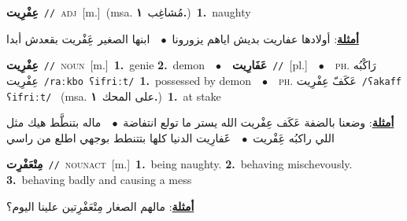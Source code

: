 \documentclass[10pt,a4paper,twoside]{article} %
\begin{document}
\begin{multicols}{2}
{\setlength\topsep{0pt}\textbf{\foreignlanguage{arabic}{عِفْرِيت}}\ {\color{gray}\texttt{//}\color{black}}\ \textsc{adj}\ [m.]\ \color{gray}(msa. \foreignlanguage{arabic}{مُشاغِب}~\foreignlanguage{arabic}{\textbf{١.}})\color{black}\ \textbf{1.}~naughty\  \begin{flushright}\color{gray}\foreignlanguage{arabic}{\textbf{\underline{\foreignlanguage{arabic}{أمثلة}}}: أولادها عفاريت بديش اياهم يزورونا\ $\bullet$\ \  ابنها الصغير عَِفْريت بقعدش أبدا}\end{flushright}\color{black}} \vspace{2mm}

{\setlength\topsep{0pt}\textbf{\foreignlanguage{arabic}{عِفْرِيت}}\ {\color{gray}\texttt{//}\color{black}}\ \textsc{noun}\ [m.]\ \textbf{1.}~genie  \textbf{2.}~demon\ \ $\bullet$\ \ \setlength\topsep{0pt}\textbf{\foreignlanguage{arabic}{عَفَارِيت}}\ {\color{gray}\texttt{//}\color{black}}\ [pl.]\ \ $\bullet$\ \ \textsc{ph.} \color{gray} \foreignlanguage{arabic}{رَاكْبُه عِفْرِيت}\color{black}\ {\color{gray}\texttt{/{\sffamily raːkbo ʕifriːt}/}\color{black}}\ \textbf{1.}~possessed by demon\ \ $\bullet$\ \ \textsc{ph.} \color{gray} \foreignlanguage{arabic}{عَكَفّ عِفْرِيت}\color{black}\ {\color{gray}\texttt{/{\sffamily ʕakaff ʕifriːt}/}\color{black}}\ \color{gray} (msa. \foreignlanguage{arabic}{على المحك}~\foreignlanguage{arabic}{\textbf{١.}})\color{black}\ \textbf{1.}~at stake\  \begin{flushright}\color{gray}\foreignlanguage{arabic}{\textbf{\underline{\foreignlanguage{arabic}{أمثلة}}}: وضعنا بالضفة عَكَف عِفْريت الله يستر ما تولع انتفاضة\ $\bullet$\ \  ماله بتنطَّط هيك مثل اللي راكبُه عَِفْريت\ $\bullet$\ \  عََفارِيت الدنيا كلها بتتنطط بوجهي اطلع من راسي}\end{flushright}\color{black}} \vspace{2mm}

{\setlength\topsep{0pt}\textbf{\foreignlanguage{arabic}{مِتْعَفْرِت}}\ {\color{gray}\texttt{//}\color{black}}\ \textsc{noun\textunderscore act}\ [m.]\ \textbf{1.}~being naughty.  \textbf{2.}~behaving mischevously.  \textbf{3.}~behaving badly and causing a mess\  \begin{flushright}\color{gray}\foreignlanguage{arabic}{\textbf{\underline{\foreignlanguage{arabic}{أمثلة}}}: مالهم الصغار مِتْعَفْرِتين علينا اليوم؟}\end{flushright}\color{black}} \vspace{2mm}


\end{multicols}
\end{document}
